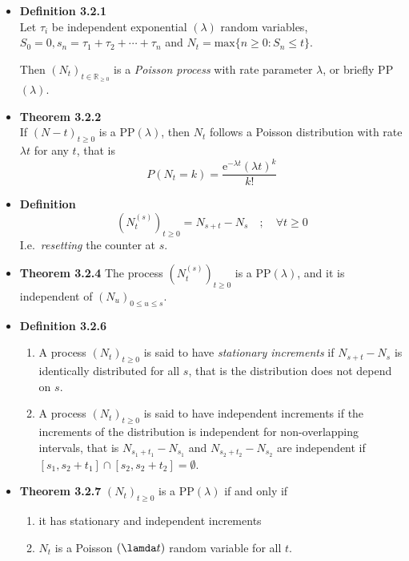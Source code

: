 \documentclass[11pt,a4paper]{article}
\begin{document}
\begin{itemize}
    \item \textbf{Definition 3.2.1} \\
        Let $\tau_i$ be independent exponential $(\lambda)$ random variables,
        $S_0 = 0, s_n = \tau_1 + \tau_2 + \cdots + \tau_n$ and
        $N_t = \text{max}\{n \geq 0 : S_n \leq t \}$.

        Then ${(N_t)}_{t \in \mathbb{R}_{\geq 0}}$ is a \emph{Poisson process} with rate parameter
        $\lambda$, or briefly PP$(\lambda)$.
    \item \textbf{Theorem 3.2.2} \\
        If ${(N-t)}_{t \geq 0}$ is a $\mathrm{PP}(\lambda)$,
        then $N_t$ follows a Poisson distribution with rate $\lambda t$ for any $t$,
        that is
        \[
            P(N_t = k) = \frac{\mathrm{e}^{-\lambda t} {(\lambda t)}^k}{k!}
        \]
    \item \textbf{Definition}
        \[
            {\left(N_t^{(s)}\right)}_{t\geq 0} = N_{s+t} - N_s \quad ; \quad \forall t \geq 0
        \]
        I.e.\ \emph{resetting} the counter at $s$.
    \item \textbf{Theorem 3.2.4}
        The process ${(N_t^{(s)})}_{t \geq 0}$ is a $\mathrm{PP}(\lambda)$,
        and it is independent of ${(N_u)}_{0 \leq u \leq s}$.
    \item \textbf{Definition 3.2.6}
        \begin{enumerate}
            \item A process ${(N_t)}_{t\geq 0}$ is said to have \emph{stationary increments}
                if $N_{s+t} - N_s$ is identically distributed for all $s$,
                that is the distribution does not depend on $s$.
            \item A process ${(N_t)}_{t\geq 0}$ is said to have independent increments if the
                increments of the distribution is independent for non-overlapping intervals,
                that is $N_{s_1 + t_1} - N_{s_1}$ and $N_{s_2 + t_2} - N_{s_2}$
                are independent if $[s_1,s_2 + t_1] \cap [s_2, s_2 + t_2] = \emptyset$.
        \end{enumerate}
    \item \textbf{Theorem 3.2.7}
        ${(N_t)}_{t \geq 0}$ is a $\mathrm{PP}(\lambda)$ if and only if
        \begin{enumerate}
            \item it has stationary and independent increments
            \item $N_t$ is a Poisson $(\lamda t)$ random variable for all $t$.

\end{enumerate}
\end{itemize}
\end{document}
